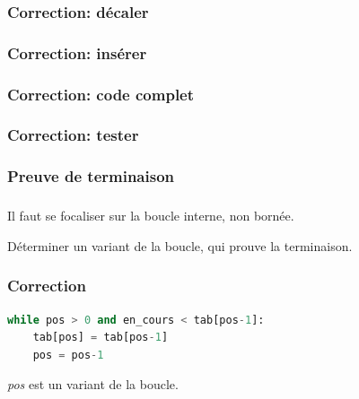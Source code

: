 \documentclass[svgnames,11pt]{beamer}
\begin{document}
\begin{frame}
    \frametitle{Correction: décaler}

    

\end{frame} 
\begin{frame}
    \frametitle{Correction: insérer}

    

\end{frame}

\begin{frame}
    \frametitle{Correction: code complet}

    

\end{frame}
\begin{frame}
    \frametitle{Correction: tester}

    

\end{frame}
\subsubsection{Preuve de terminaison}
\begin{frame}
    \frametitle{}

    Il faut se focaliser sur la boucle interne, non bornée.
    \begin{activite}
        Déterminer un variant de la boucle, qui prouve la terminaison.
    \end{activite}

\end{frame}

\begin{frame}[fragile]
    \frametitle{Correction}

\begin{center}
\begin{lstlisting}[language=Python, basicstyle=\small, xrightmargin=1em]
while pos > 0 and en_cours < tab[pos-1]:
    tab[pos] = tab[pos-1]
    pos = pos-1
\end{lstlisting}
\end{center}

    \emph{pos} est un variant de la boucle. 
\end{frame} 
\end{document}
